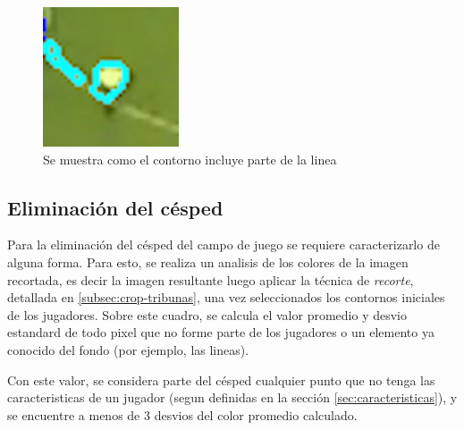 \begin{figure}[H]
  \centering
    \begin{minipage}[t]{.45\textwidth}
      \includegraphics[width=\linewidth]{./images/confusion-linea.png}
      \caption{Se muestra como el contorno incluye parte de la linea
      \label{fig:confusion-linea}}
    \end{minipage}
\end{figure}

\subsection{Eliminación del césped}
\label{sec:cesped}

Para la eliminación del césped del campo de juego se requiere caracterizarlo
de alguna forma. Para esto, se realiza un analisis de los colores de
la imagen recortada, es decir la imagen resultante luego aplicar la técnica
de \textit{recorte}, detallada en \ref{subsec:crop-tribunas}, una vez seleccionados
los contornos iniciales de los jugadores. Sobre este cuadro, se calcula el valor
promedio y desvio estandard de todo pixel que no forme parte de los jugadores o
un elemento ya conocido del fondo (por ejemplo, las lineas). 

Con este valor, se considera parte del césped cualquier punto que no tenga las
caracteristicas de un jugador (segun definidas en la sección \ref{sec:caracteristicas}),
y se encuentre a menos de 3 desvios del color promedio calculado.

